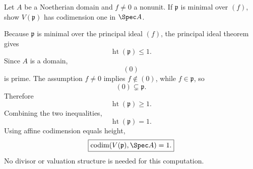\begin{problem}\label{prob:vi31-18}
Let \(A\) be a Noetherian domain and \(f\neq0\) a nonunit. If \(\mathfrak p\) is minimal over \((f)\), show \(V(\mathfrak p)\) has codimension one in \(\Spec A\).
\end{problem}

\ifdefined\FullProblemDossiers
\begin{solution}
Because \(\mathfrak p\) is minimal over the principal ideal \((f)\), the principal ideal theorem gives
\[
\operatorname{ht}(\mathfrak p)\le1.
\]
Since \(A\) is a domain,
\[
(0)
\]
is prime. The assumption \(f\ne0\) implies \(f\notin(0)\), while \(f\in\mathfrak p\), so
\[
(0)\subsetneq\mathfrak p.
\]
Therefore
\[
\operatorname{ht}(\mathfrak p)\ge1.
\]
Combining the two inequalities,
\[
\operatorname{ht}(\mathfrak p)=1.
\]
Using affine codimension equals height,
\[
\boxed{
\operatorname{codim}(V(\mathfrak p),\Spec A)=1.
}
\]
No divisor or valuation structure is needed for this computation.
\end{solution}
\fi
